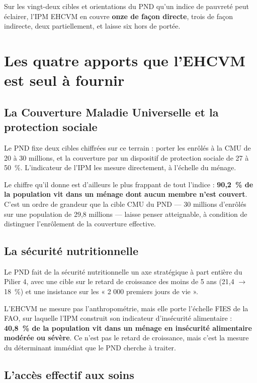 \documentclass[11pt,a4paper]{article}
\begin{document}
\begin{retenir}[Le décompte]
Sur les vingt-deux cibles et orientations du PND qu'un indice de pauvreté peut éclairer, l'IPM
EHCVM en couvre \textbf{onze de façon directe}, trois de façon indirecte, deux partiellement, et
laisse six hors de portée.
\end{retenir}

\section{Les quatre apports que l'EHCVM est seul à fournir}

\subsection{La Couverture Maladie Universelle et la protection sociale}

Le PND fixe deux cibles chiffrées sur ce terrain : porter les enrôlés à la CMU de 20 à 30 millions,
et la couverture par un dispositif de protection sociale de 27 à 50~\%. L'indicateur
 de l'IPM les mesure directement, à l'échelle du ménage.

Le chiffre qu'il donne est d'ailleurs le plus frappant de tout l'indice : \textbf{90,2~\% de la
population vit dans un ménage dont aucun membre n'est couvert}. C'est un ordre de grandeur que la
cible CMU du PND --- 30 millions d'enrôlés sur une population de 29,8 millions --- laisse penser
atteignable, à condition de distinguer l'enrôlement de la couverture effective.

\subsection{La sécurité nutritionnelle}

Le PND fait de la sécurité nutritionnelle un axe stratégique à part entière du Pilier 4, avec une
cible sur le retard de croissance des moins de 5 ans (21,4 $\to$ 18~\%) et une insistance sur les
« 2 000 premiers jours de vie ».

L'EHCVM ne mesure pas l'anthropométrie, mais elle porte l'échelle FIES de la FAO, sur laquelle
l'IPM construit son indicateur d'insécurité alimentaire : \textbf{40,8~\% de la population vit dans
un ménage en insécurité alimentaire modérée ou sévère}. Ce n'est pas le retard de croissance, mais
c'est la mesure du déterminant immédiat que le PND cherche à traiter.

\subsection{L'accès effectif aux soins}
\end{document}

